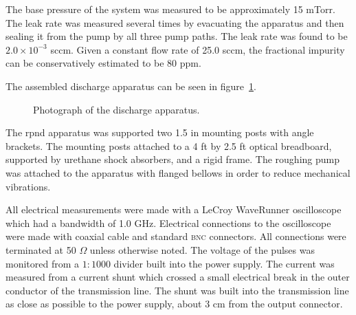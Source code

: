 The base pressure of the system was measured to be approximately 15 mTorr. The
leak rate was measured several times by evacuating the apparatus and then
sealing it from the pump by all three pump paths. The leak rate was found to be
$2.0\times 10^{-3}$ sccm. Given a constant flow rate of 25.0 sccm, the
fractional impurity can be conservatively estimated to be 80 ppm.

The assembled discharge apparatus can be seen in figure~\ref{fig:appphoto}.
\begin{figure}
  \centering
  \setlength\fboxsep{0pt}
  \setlength\fboxrule{1.0pt}
  \caption{Photograph of the discharge apparatus.}
  \label{fig:appphoto}
\end{figure}
The \acs{rpnd} apparatus was supported two 1.5 in mounting posts with angle
brackets. The mounting posts attached to a 4 ft by 2.5 ft optical breadboard,
supported by urethane shock absorbers, and a rigid frame. The roughing pump was
attached to the apparatus with flanged bellows in order to reduce mechanical
vibrations.

All electrical measurements were made with a LeCroy  WaveRunner
oscilloscope which had a bandwidth of 1.0 GHz. Electrical connections to the
oscilloscope were made with  coaxial cable and standard
\textsc{bnc} connectors. All connections were terminated at 50 $\Omega$ unless
otherwise noted. The voltage of the pulses was monitored from a $1:1000$ divider
built into the power supply. The current was measured from a current shunt which
crossed a small electrical break in the outer conductor of the transmission
line. The shunt was built into the transmission line as close as possible to the
power supply, about 3 cm from the output connector.

